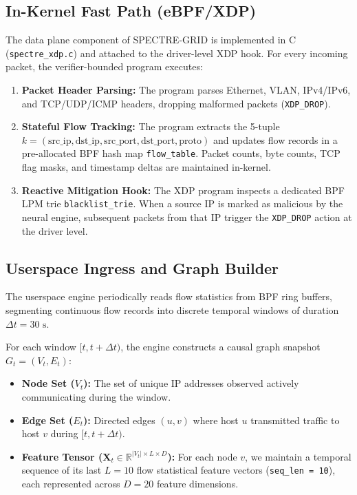 \documentclass[conference]{IEEEtran}
\begin{document}
\subsection{In-Kernel Fast Path (eBPF/XDP)}
The data plane component of SPECTRE-GRID is implemented in C (\texttt{spectre\_xdp.c}) and attached to the driver-level XDP hook. For every incoming packet, the verifier-bounded program executes:
\begin{enumerate}
    \item \textbf{Packet Header Parsing:} The program parses Ethernet, VLAN, IPv4/IPv6, and TCP/UDP/ICMP headers, dropping malformed packets (\texttt{XDP\_DROP}).
    \item \textbf{Stateful Flow Tracking:} The program extracts the 5-tuple $k = (\text{src\_ip}, \text{dst\_ip}, \text{src\_port}, \text{dst\_port}, \text{proto})$ and updates flow records in a pre-allocated BPF hash map \texttt{flow\_table}. Packet counts, byte counts, TCP flag masks, and timestamp deltas are maintained in-kernel.
    \item \textbf{Reactive Mitigation Hook:} The XDP program inspects a dedicated BPF LPM trie \texttt{blacklist\_trie}. When a source IP is marked as malicious by the neural engine, subsequent packets from that IP trigger the \texttt{XDP\_DROP} action at the driver level.
\end{enumerate}

\subsection{Userspace Ingress and Graph Builder}
The userspace engine periodically reads flow statistics from BPF ring buffers, segmenting continuous flow records into discrete temporal windows of duration $\Delta t = 30\text{ s}$.

For each window $[t, t + \Delta t)$, the engine constructs a causal graph snapshot $G_t = (V_t, E_t)$:
\begin{itemize}
    \item \textbf{Node Set ($V_t$):} The set of unique IP addresses observed actively communicating during the window.
    \item \textbf{Edge Set ($E_t$):} Directed edges $(u, v)$ where host $u$ transmitted traffic to host $v$ during $[t, t + \Delta t)$.
    \item \textbf{Feature Tensor ($\mathbf{X}_t \in \mathbb{R}^{|V_t| \times L \times D}$):} For each node $v$, we maintain a temporal sequence of its last $L=10$ flow statistical feature vectors (\texttt{seq\_len = 10}), each represented across $D=20$ feature dimensions.
\end{itemize}
\end{document}
